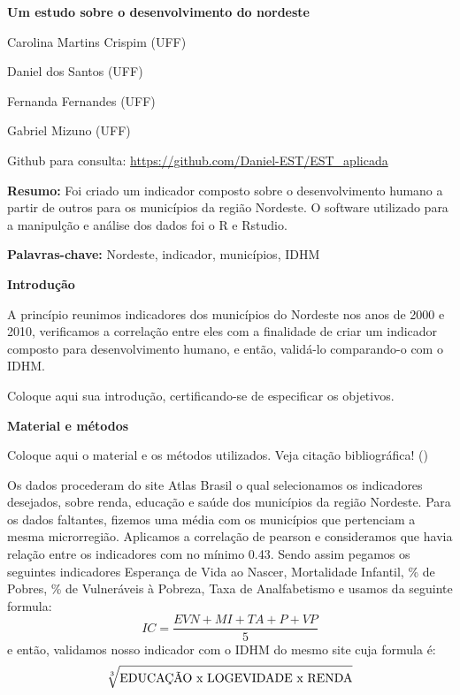 \documentclass[11pt,a4paper]{article}
\begin{document}
\begin{center}
\Large{\textbf{Um estudo sobre o desenvolvimento do nordeste }}

\bigskip

\begin{singlespace}
\large{Carolina Martins Crispim (UFF)

Daniel dos Santos (UFF)

Fernanda Fernandes (UFF)

Gabriel Mizuno (UFF)} 

\bigskip

\small{Github para consulta: \url{https://github.com/Daniel-EST/EST_aplicada}}
\end{singlespace}
\end{center}


\textbf{Resumo:} Foi criado um indicador composto sobre o desenvolvimento humano a partir de outros para os municípios da região Nordeste. O software utilizado para a manipulção e análise dos dados foi o R e Rstudio.


\textbf{Palavras-chave:} Nordeste, indicador, municípios, IDHM


\textbf{Introdução}

A princípio reunimos indicadores dos municípios do Nordeste nos anos de 2000 e 2010, verificamos a correlação entre eles com a finalidade de criar um indicador composto para desenvolvimento humano, e então, validá-lo comparando-o com o IDHM. 

Coloque aqui sua introdução, certificando-se de especificar os objetivos. 

\textbf{Material e métodos}

Coloque aqui o material e os métodos utilizados. Veja citação bibliográfica! (\cite{KK})

Os dados procederam do site Atlas Brasil o qual selecionamos os indicadores desejados, sobre renda, educação e saúde dos municípios da região Nordeste. Para os dados faltantes, fizemos uma média com os municípios que pertenciam a mesma microrregião. Aplicamos a correlação de pearson e consideramos que havia relação entre os indicadores com no mínimo 0.43. Sendo assim pegamos os seguintes indicadores Esperança de Vida ao Nascer, Mortalidade Infantil,  \% de Pobres, \% de Vulneráveis à Pobreza, Taxa de Analfabetismo e usamos da seguinte formula: $$ IC = \frac{EVN+MI+TA+P+VP}{5} $$ e então, validamos nosso indicador com o IDHM do mesmo site cuja formula é: $$ \sqrt[3]{\hbox{EDUCAÇÃO x LOGEVIDADE x RENDA}}$$
\end{document}
